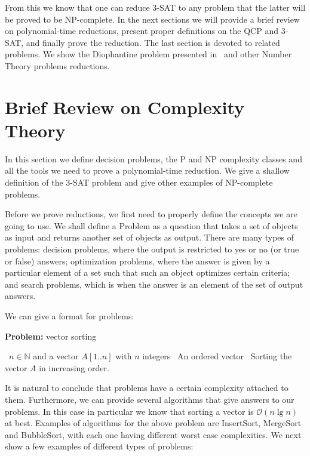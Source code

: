 \documentclass{amsart}
\theoremstyle{plain}
\newcommand{\bigo}{\mathcal{O}}
\begin{document}
From this we know that one can reduce 3-SAT to any problem that the latter will be proved to be
NP-complete. In the next sections we will provide a brief review on polynomial-time reductions,
present proper definitions on the QCP and 3-SAT, and finally prove the reduction. The last section
is devoted to related problems. We show the Diophantine problem presented in~\cite{qcp2} and other
Number Theory problems reductions.

\section{Brief Review on Complexity Theory}

In this section we define decision problems, the P and NP complexity classes and all the tools we
need to prove a polynomial-time reduction. We give a shallow definition of the 3-SAT problem and
give other examples of NP-complete problems.

Before we prove reductions, we first need to properly define the concepts we are going to use. We
shall define a Problem as a question that takes a set of objects as input and returns another set
of objects as output. There are many types of problems: decision problems, where the output is
restricted to yes or no (or true or false) answers; optimization problems, where the answer is
given by a particular element of a set such that such an object optimizes certain criteria; and
search problems, which is when the answer is an element of the set of output answers.

We can give a format for problems:

\begin{algorithm}[h]
  \caption*{\textbf{Problem:} vector sorting}
  \begin{algorithmic}[1]
    \Require\, $n\in\mathbb{N}$ and a vector $A[1..n]$ with $n$ integers
    \Ensure\, An ordered vector
    \Description\, Sorting the vector $A$ in increasing order.
  \end{algorithmic}
\end{algorithm}

It is natural to conclude that problems have a certain complexity attached to them. Furthermore, we
can provide several algorithms that give answers to our problems. In this case in particular we
know that sorting a vector is $\bigo(n\lg n)$ at best. Examples of algorithms for the above problem
are InsertSort, MergeSort and BubbleSort, with each one having different worst case complexities.
We next show a few examples of different types of problems:
\end{document}
